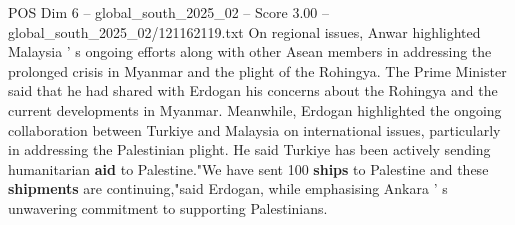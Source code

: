 \begin{textsample}{POS Dim 6 – global\_south\_2025\_02 – Score 3.00 – global\_south\_2025\_02/121162119.txt}
On regional issues, Anwar highlighted Malaysia ' s ongoing efforts along with other Asean members in addressing the prolonged crisis in Myanmar and the plight of the Rohingya.
The Prime Minister said that he had shared with Erdogan his concerns about the Rohingya and the current developments in Myanmar.
Meanwhile, Erdogan highlighted the ongoing collaboration between Turkiye and Malaysia on international issues, particularly in addressing the Palestinian plight.
He said Turkiye has been actively sending humanitarian \textbf{aid} to Palestine."We have sent 100 \textbf{ships} to Palestine and these \textbf{shipments} are continuing,"said Erdogan, while emphasising Ankara ' s unwavering commitment to supporting Palestinians.

\end{textsample}
